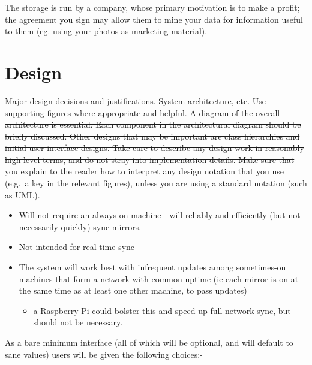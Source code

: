 \documentclass[12pt,a4paper,]{adreport}
\begin{document}
The storage is run by a company, whose primary motivation is to make a
profit; the agreement you sign may allow them to mine your data for
information useful to them (eg. using your photos as marketing
material).

\chapter{Design}\label{design}

\sout{Major design decisions and justifications. System architecture,
etc. Use supporting figures where appropriate and helpful. A diagram of
the overall architecture is essential. Each component in the
architectural diagram should be briefly discussed. Other designs that
may be important are class hierarchies and initial user interface
designs. Take care to describe any design work in reasonably high level
terms, and do not stray into implementation details. Make sure that you
explain to the reader how to interpret any design notation that you use
(e.g.~a key in the relevant figures), unless you are using a standard
notation (such as UML).}

\begin{itemize}
\itemsep1pt\parskip0pt
\item
  Will not require an always-on machine - will reliably and efficiently
  (but not necessarily quickly) sync mirrors.
\item
  Not intended for real-time sync
\item
  The system will work best with infrequent updates among sometimes-on
  machines that form a network with common uptime (ie each mirror is on
  at the same time as at least one other machine, to pass updates)

  \begin{itemize}
  \itemsep1pt\parskip0pt
  \item
    a Raspberry Pi could bolster this and speed up full network sync,
    but should not be necessary.
  \end{itemize}
\end{itemize}

As a bare minimum interface (all of which will be optional, and will
default to sane values) users will be given the following choices:-
\end{document}
